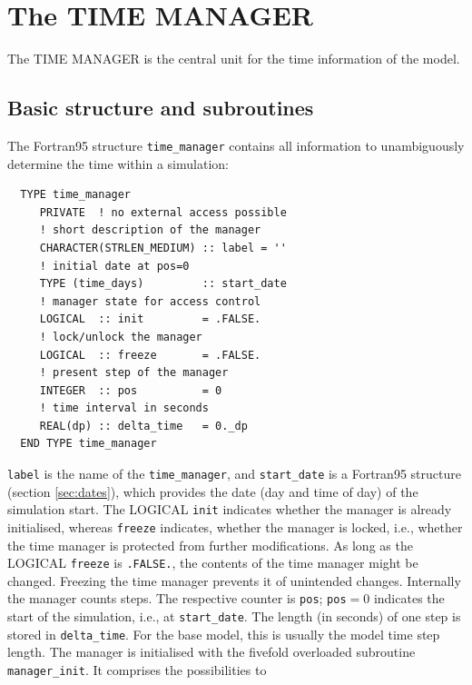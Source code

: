 \documentclass[twoside]{article}
\begin{document}
\section{The TIME MANAGER}
\label{sec:time_manager}
%
The TIME MANAGER is the central unit for the time information of the model.
%
\subsection{Basic structure and subroutines}
%
The Fortran95 structure 
\verb|time_manager| contains all information to unambiguously
determine the time within a simulation:
%
\begin{verbatim}
  TYPE time_manager
     PRIVATE  ! no external access possible
     ! short description of the manager
     CHARACTER(STRLEN_MEDIUM) :: label = '' 
     ! initial date at pos=0
     TYPE (time_days)         :: start_date 
     ! manager state for access control
     LOGICAL  :: init         = .FALSE.  
     ! lock/unlock the manager
     LOGICAL  :: freeze       = .FALSE.  
     ! present step of the manager
     INTEGER  :: pos          = 0       
     ! time interval in seconds
     REAL(dp) :: delta_time   = 0._dp  
  END TYPE time_manager
\end{verbatim}
%
\verb|label| is the name of the \verb|time_manager|, and
\verb|start_date| is a Fortran95 structure (section \ref{sec:dates}),
which provides the date (day and time of day) of the simulation start.
%
The {\footnotesize LOGICAL} \verb|init| indicates whether the manager is already initialised, 
whereas \verb|freeze| indicates, whether the manager is locked, i.e., whether
the time manager is protected from further modifications.
%
As long as the {\footnotesize LOGICAL} \verb|freeze| is \verb|.FALSE.|, the contents of the
time manager might be changed. Freezing the time manager prevents it of
unintended changes.
%
Internally the manager counts steps. The respective counter is 
\verb|pos|; \verb|pos|$=0$ indicates the start of the simulation, i.e., at
\verb|start_date|. 
%
The length (in seconds) of one step is stored in \verb|delta_time|. For the
base model, this is usually the model time step length.
%
The manager is initialised with the fivefold overloaded
subroutine \verb|manager_init|. It comprises the possibilities to
%
\end{document}
